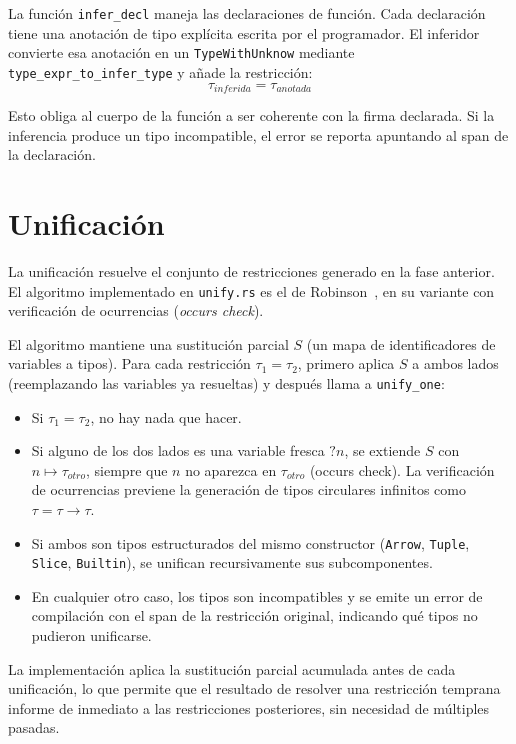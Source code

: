 La función \lstinline|infer_decl| maneja las declaraciones de función. Cada declaración tiene una anotación de tipo explícita escrita por el programador. El inferidor convierte esa anotación en un \lstinline|TypeWithUnknow| mediante \lstinline|type_expr_to_infer_type| y añade la restricción:
\[\tau_{inferida} = \tau_{anotada}\]

Esto obliga al cuerpo de la función a ser coherente con la firma declarada. Si la inferencia produce un tipo incompatible, el error se reporta apuntando al span de la declaración.

\section{Unificación}
\label{sec:unificacion}

La unificación resuelve el conjunto de restricciones generado en la fase anterior. El algoritmo implementado en \lstinline|unify.rs| es el de Robinson~\cite{robinson_1965}, en su variante con verificación de ocurrencias (\textit{occurs check}).

El algoritmo mantiene una sustitución parcial $S$ (un mapa de identificadores de variables a tipos). Para cada restricción $\tau_1 = \tau_2$, primero aplica $S$ a ambos lados (reemplazando las variables ya resueltas) y después llama a \lstinline|unify_one|:

\begin{itemize}
  \item Si $\tau_1 = \tau_2$, no hay nada que hacer.
  \item Si alguno de los dos lados es una variable fresca $?n$, se extiende $S$ con $n \mapsto \tau_{otro}$, siempre que $n$ no aparezca en $\tau_{otro}$ (occurs check). La verificación de ocurrencias previene la generación de tipos circulares infinitos como $\tau = \tau \to \tau$.
  \item Si ambos son tipos estructurados del mismo constructor (\lstinline|Arrow|, \lstinline|Tuple|, \lstinline|Slice|, \lstinline|Builtin|), se unifican recursivamente sus subcomponentes.
  \item En cualquier otro caso, los tipos son incompatibles y se emite un error de compilación con el span de la restricción original, indicando qué tipos no pudieron unificarse.
\end{itemize}

La implementación aplica la sustitución parcial acumulada antes de cada unificación, lo que permite que el resultado de resolver una restricción temprana informe de inmediato a las restricciones posteriores, sin necesidad de múltiples pasadas.

